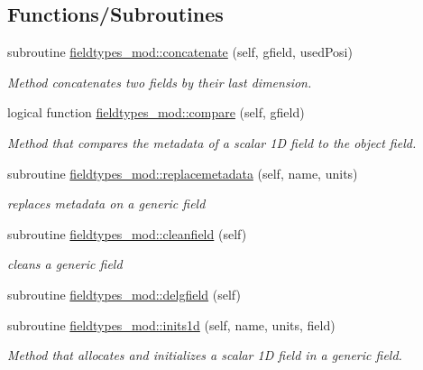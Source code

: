\subsection*{Functions/\+Subroutines}
\begin{DoxyCompactItemize}
\item 
subroutine \mbox{\hyperlink{namespacefieldtypes__mod_a67cc0dfdc7206a2769746ff7879a4375}{fieldtypes\+\_\+mod\+::concatenate}} (self, gfield, used\+Posi)
\begin{DoxyCompactList}\small\item\em Method concatenates two fields by their last dimension. \end{DoxyCompactList}\item 
logical function \mbox{\hyperlink{namespacefieldtypes__mod_aad356f6f10d8edc58c56f02c796423f3}{fieldtypes\+\_\+mod\+::compare}} (self, gfield)
\begin{DoxyCompactList}\small\item\em Method that compares the metadata of a scalar 1D field to the object field. \end{DoxyCompactList}\item 
subroutine \mbox{\hyperlink{namespacefieldtypes__mod_ad8f3bf57dafb3eac18e5a3198e36047c}{fieldtypes\+\_\+mod\+::replacemetadata}} (self, name, units)
\begin{DoxyCompactList}\small\item\em replaces metadata on a generic field \end{DoxyCompactList}\item 
subroutine \mbox{\hyperlink{namespacefieldtypes__mod_a1d491079d69fb297c4fedd4f37d85e8e}{fieldtypes\+\_\+mod\+::cleanfield}} (self)
\begin{DoxyCompactList}\small\item\em cleans a generic field \end{DoxyCompactList}\item 
subroutine \mbox{\hyperlink{namespacefieldtypes__mod_a4ec7b627804dfcdf20e3374ecc1cf459}{fieldtypes\+\_\+mod\+::delgfield}} (self)
\item 
subroutine \mbox{\hyperlink{namespacefieldtypes__mod_a3f1571ad15733a3f2fff43e35f309416}{fieldtypes\+\_\+mod\+::inits1d}} (self, name, units, field)
\begin{DoxyCompactList}\small\item\em Method that allocates and initializes a scalar 1D field in a generic field. \end{DoxyCompactList}\item 

\end{DoxyCompactItemize}
